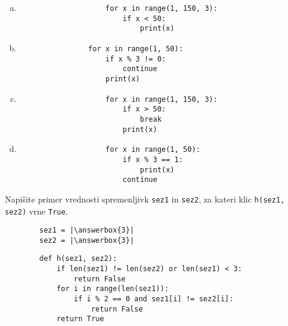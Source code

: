 \documentclass[arhiv, 10pt]{../izpit}
\newcommand{\inlinepy}[1]{\texttt{#1}}
\newcommand{\answerbox}[1]{\framebox{\vphantom{\large M}\hspace{#1cm}}}
\begin{document}
        \begin{multicols}{2}
        \begin{enumerate}[(a)]
\item 
                \begin{verbatim}
                    for x in range(1, 150, 3):
                        if x < 50:
                            print(x)
                \end{verbatim}
            
\item 
            \begin{verbatim}
                for x in range(1, 50):
                    if x % 3 != 0:
                        continue
                    print(x)
            \end{verbatim}
        
\item 
                \begin{verbatim}
                    for x in range(1, 150, 3):
                        if x > 50:
                            break
                        print(x)
                \end{verbatim}
            
\item 
                \begin{verbatim}
                    for x in range(1, 50):
                        if x % 3 == 1:
                            print(x)
                        continue
                \end{verbatim}
            
\end{enumerate}

        \end{multicols}
    
        \naloga*
        \begin{multicols}{2}
        \noindent
        Napišite primer vrednosti spremenljivk \inlinepy{sez1} in \inlinepy{sez2}, za kateri klic \inlinepy{h(sez1, sez2)} vrne \inlinepy{True}.
        \begin{verbatim}
        sez1 = |\answerbox{3}|
        sez2 = |\answerbox{3}|
        \end{verbatim}
        \vfil
        \columnbreak
        \begin{verbatim}
        def h(sez1, sez2):
            if len(sez1) != len(sez2) or len(sez1) < 3:
                return False
            for i in range(len(sez1)):
                if i % 2 == 0 and sez1[i] != sez2[i]:
                    return False
            return True
        \end{verbatim}
        \end{multicols}
    
\end{document}
